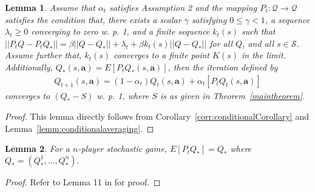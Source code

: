 \documentclass[jair, twoside,11pt,theapa]{article}
\newtheorem{lemm2}{Lemma}
\begin{document}
\begin{lemm2}
Assume that $\alpha_t$ satisfies Assumption 2 and the mapping $P_t: \mathcal{Q} \xrightarrow{} \mathcal{Q}$ satisfies the condition that, there exists a scalar $\gamma$ satisfying $0 \leq \gamma < 1$, a sequence $\lambda_t \geq 0$ converging to zero w. p. 1, and a finite sequence $k_t(s)$ such that $|| P_tQ  - P_t Q_{*} || = \beta ||Q - Q_{*} || + \lambda_t + \beta k_t(s)||Q - Q_{*} ||$ for all $Q$, and all $s \in \mathcal{S}$. Assume further that, $k_t(s)$ converges to a finite point $K(s)$ in the limit. Additionally, $Q_{*}(s, \boldsymbol{a}) = E[P_tQ_{*}(s, \boldsymbol{a}) ]$, then the iteration defined by 
\begin{equation*}
    \begin{array}{l}
         Q_{t+1}(s, \boldsymbol{a}) = (1 - \alpha_t)Q_t(s, \boldsymbol{a})  +\alpha_t[P_t Q_t(s, \boldsymbol{a})]
    \end{array}
\end{equation*}
converges to $(Q_{*} - S)$ w. p. 1, where $S$ is as given in Theorem~\ref{maintheorem}. 
\end{lemm2}

\begin{proof}
This lemma directly follows from Corollary~\ref{corr:conditionalCorollary} and Lemma~\ref{lemm:conditionalaveraging}. 
\end{proof}




\begin{lemm2}
For a $n$-player stochastic game, $E[P_t Q_{*}] = Q_{*}$ where $Q_* = (Q^1_{*}, \ldots, Q^n_{*}).$
\end{lemm2}


\begin{proof}

         
         
         
Refer to Lemma 11 in  \cite{hu2003nash} for proof. 
\end{proof}
\end{document}
